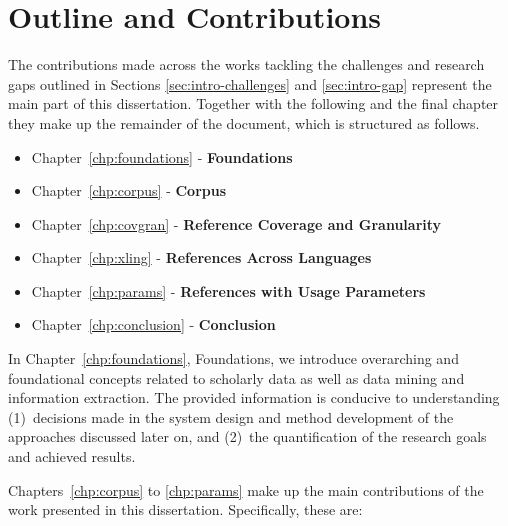 


\section{Outline and Contributions}

The contributions made across the works tackling the challenges and research gaps outlined in Sections \ref{sec:intro-challenges} and \ref{sec:intro-gap} represent the main part of this dissertation. Together with the following and the final chapter they make up the remainder of the document, which is structured as follows.

\begin{itemize}
    \item Chapter~\ref{chp:foundations} - \textbf{Foundations}
    \item Chapter~\ref{chp:corpus} - \textbf{Corpus}
    \item Chapter~\ref{chp:covgran} - \textbf{Reference Coverage and Granularity}
    \item Chapter~\ref{chp:xling} - \textbf{References Across Languages}
    \item Chapter~\ref{chp:params} - \textbf{References with Usage Parameters}
    \item Chapter~\ref{chp:conclusion} - \textbf{Conclusion}
\end{itemize}

In Chapter~\ref{chp:foundations}, Foundations, we introduce overarching and foundational concepts related to scholarly data as well as data mining and information extraction. The provided information is conducive to understanding (1)~decisions made in the system design and method development of the approaches discussed later on, and (2)~the quantification of the research goals and achieved results.

Chapters~\ref{chp:corpus} to \ref{chp:params} make up the main contributions of the work presented in this dissertation. Specifically, these are:

